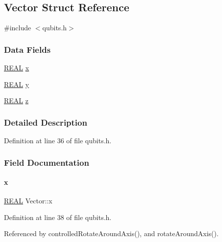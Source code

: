 \hypertarget{structVector}{}\subsection{Vector Struct Reference}
\label{structVector}


{\ttfamily \#include $<$qubits.\+h$>$}

\subsubsection*{Data Fields}
\begin{DoxyCompactItemize}
\item 
\mbox{\hyperlink{precision_8h_a4b654506f18b8bfd61ad2a29a7e38c25}{R\+E\+AL}} \mbox{\hyperlink{structVector_aac7abe171ba4bada50ed72acba6259fc}{x}}
\item 
\mbox{\hyperlink{precision_8h_a4b654506f18b8bfd61ad2a29a7e38c25}{R\+E\+AL}} \mbox{\hyperlink{structVector_a375ca805d4c808a53d7c4e0c737ae3de}{y}}
\item 
\mbox{\hyperlink{precision_8h_a4b654506f18b8bfd61ad2a29a7e38c25}{R\+E\+AL}} \mbox{\hyperlink{structVector_ad4e863651be7d6b7e2b28cd7445a0ccf}{z}}
\end{DoxyCompactItemize}


\subsubsection{Detailed Description}


Definition at line 36 of file qubits.\+h.



\subsubsection{Field Documentation}
\mbox{\label{structVector_aac7abe171ba4bada50ed72acba6259fc}} 
\paragraph{\texorpdfstring{x}{x}}
{\footnotesize\ttfamily \mbox{\hyperlink{precision_8h_a4b654506f18b8bfd61ad2a29a7e38c25}{R\+E\+AL}} Vector\+::x}



Definition at line 38 of file qubits.\+h.



Referenced by controlled\+Rotate\+Around\+Axis(), and rotate\+Around\+Axis().

